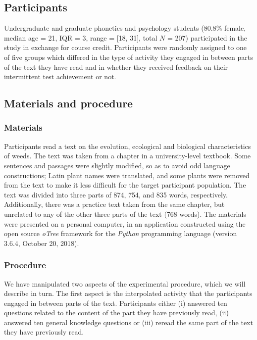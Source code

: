 \documentclass[11pt,]{article}
\title{}
\author{}
\date{}
\begin{document}
\hypertarget{participants}{%
\subsection{Participants}\label{participants}}

Undergraduate and graduate phonetics and psychology students (80.8\%
female, median age = 21, IQR = 3, range = {[}18, 31{]}, total \(N\) =
207) participated in the study in exchange for course credit.
Participants were randomly assigned to one of five groups which differed
in the type of activity they engaged in between parts of the text they
have read and in whether they received feedback on their intermittent
test achievement or not.

\hypertarget{materials-and-procedure}{%
\subsection{Materials and procedure}\label{materials-and-procedure}}

\hypertarget{materials}{%
\subsubsection{Materials}\label{materials}}

Participants read a text on the evolution, ecological and biological
characteristics of weeds. The text was taken from a chapter in a
university-level textbook. Some sentences and passages were slightly
modified, so as to avoid odd language constructions; Latin plant names
were translated, and some plants were removed from the text to make it
less difficult for the target participant population. The text was
divided into three parts of 874, 754, and 835 words, respectively.
Additionally, there was a practice text taken from the same chapter, but
unrelated to any of the other three parts of the text (768 words). The
materials were presented on a personal computer, in an application
constructed using the open source \textit{oTree} framework
\citep[version 2.1.35,][]{chenOTreeOpensourcePlatform2016} for the
\textit{Python} programming language (version 3.6.4, October 20, 2018).

\hypertarget{procedure}{%
\subsubsection{Procedure}\label{procedure}}

We have manipulated two aspects of the experimental procedure, which we
will describe in turn. The first aspect is the interpolated activity
that the participants engaged in between parts of the text. Participants
either (i) answered ten questions related to the content of the part
they have previously read, (ii) answered ten general knowledge questions
or (iii) reread the same part of the text they have previously read.
\end{document}
